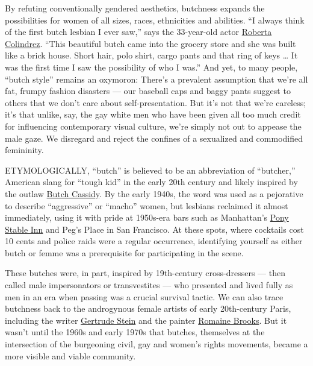 By refuting conventionally gendered aesthetics, butchness expands the
possibilities for women of all sizes, races, ethnicities and abilities.
``I always think of the first butch lesbian I ever saw,'' says the
33-year-old actor
\href{https://artsbeat.blogs.nytimes.com/2014/08/07/fun-home-will-reach-broadway-just-before-tonys-deadline/}{Roberta
Colindrez}. ``This beautiful butch came into the grocery store and she
was built like a brick house. Short hair, polo shirt, cargo pants and
that ring of keys \ldots{} It was the first time I saw the possibility
of who I was.'' And yet, to many people, ``butch style'' remains an
oxymoron: There's a prevalent assumption that we're all fat, frumpy
fashion disasters --- our baseball caps and baggy pants suggest to
others that we don't care about self-presentation. But it's not that
we're careless; it's that unlike, say, the gay white men who have been
given all too much credit for influencing contemporary visual culture,
we're simply not out to appease the male gaze. We disregard and reject
the confines of a sexualized and commodified femininity.

ETYMOLOGICALLY, ``butch'' is believed to be an abbreviation of
``butcher,'' American slang for ``tough kid'' in the early 20th century
and likely inspired by the outlaw
\href{https://www.nytimes.com/watching/recommendations/watching-film-butch-cassidy-and-the-sundance-kid}{Butch
Cassidy}. By the early 1940s, the word was used as a pejorative to
describe ``aggressive'' or ``macho'' women, but lesbians reclaimed it
almost immediately, using it with pride at 1950s-era bars such as
Manhattan's
\href{https://www.nyclgbtsites.org/site/mad-hatter-pony-stable-inn/}{Pony
Stable Inn} and Peg's Place in San Francisco. At these spots, where
cocktails cost 10 cents and police raids were a regular occurrence,
identifying yourself as either butch or femme was a prerequisite for
participating in the scene.

These butches were, in part, inspired by 19th-century cross-dressers ---
then called male impersonators or transvestites --- who presented and
lived fully as men in an era when passing was a crucial survival tactic.
We can also trace butchness back to the androgynous female artists of
early 20th-century Paris, including the writer
\href{https://www.nytimes.com/topic/person/gertrude-stein}{Gertrude
Stein} and the painter
\href{https://americanart.si.edu/artist/romaine-brooks-599}{Romaine
Brooks}. But it wasn't until the 1960s and early 1970s that butches,
themselves at the intersection of the burgeoning civil, gay and women's
rights movements, became a more visible and viable community.


